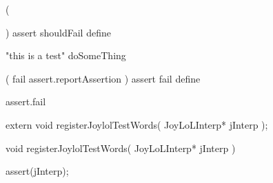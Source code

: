 (
  
)
assert
shouldFail
define
\stopJoylolCode

\startJoylolTest
"this is a test"
doSomeThing
\stopJoylolTest
\stopTestCase
\stopTestSuite
\stoptyping

\startTestSuite[assertFail]

\startJoylolCode
(
  fail
  assert.reportAssertion
)
assert
fail
define
\stopJoylolCode

\startJoylolTest
  assert.fail
\stopJoylolTest
\stopTestCase
\stopTestSuite

\startTestSuite[assertSucceed]

\stopTestSuite

\startTestSuite[assertTrue]

\stopTestSuite

\startTestSuite[assertFalse]

\stopTestSuite

\startTestSuite[assertNil]

\stopTestSuite

\startTestSuite[assertNotNil]

\stopTestSuite

\startTestSuite[assertAtom]

\stopTestSuite

\startTestSuite[assertPair]

\stopTestSuite

\startTestSuite[assertNatural]

\stopTestSuite

\startTestSuite[assertSymbol]

\stopTestSuite

\startTestSuite[assertContext]

\stopTestSuite

\startTestSuite[assertDictionary]

\stopTestSuite

\startTestSuite[assertDictNode]

\stopTestSuite


\startCHeader
extern void registerJoylolTestWords(
  JoyLoLInterp* jInterp
);
\stopCHeader
{}

\startCCode
void registerJoylolTestWords(
  JoyLoLInterp* jInterp
) {
  assert(jInterp);

}
\stopCCode
